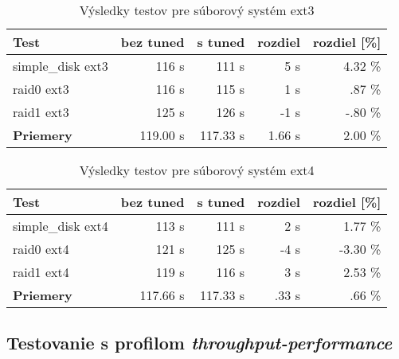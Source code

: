 \begin{table}[H]
\begin{center}
\begin{tabular}{|l|r|r|r|r|}
    \hline
    \textbf{Test} & \textbf{bez tuned} & \textbf{s tuned} & \textbf{rozdiel} & \textbf{rozdiel [\%]} \\ \hline
    simple\_disk ext3 & 116 s & 111 s & 5 s & 4.32 \% \\
    \hline
    raid0 ext3 & 116 s & 115 s & 1 s & .87 \% \\
    \hline
    raid1 ext3 & 125 s & 126 s & -1 s & -.80 \% \\
    \hline
    \textbf{Priemery} & 119.00 s & 117.33 s & 1.66 s & 2.00 \% \\
    \hline
\end{tabular}
\caption{Výsledky testov pre súborový systém ext3}
\label{tab:results-ext3}
\end{center}
\end{table}

\begin{table}[H]
\begin{center}
\begin{tabular}{|l|r|r|r|r|}
    \hline
    \textbf{Test} & \textbf{bez tuned} & \textbf{s tuned} & \textbf{rozdiel} & \textbf{rozdiel [\%]} \\ \hline
    simple\_disk ext4 & 113 s & 111 s & 2 s & 1.77 \% \\
    \hline
    raid0 ext4 & 121 s & 125 s & -4 s & -3.30 \% \\
    \hline
    raid1 ext4 & 119 s & 116 s & 3 s & 2.53 \% \\
    \hline
    \textbf{Priemery} & 117.66 s & 117.33 s & .33 s & .66 \% \\
    \hline
\end{tabular}
\caption{Výsledky testov pre súborový systém ext4}
\label{tab:results-ext4}
\end{center}
\end{table}

\subsection{Testovanie s profilom \emph{throughput-performance}}

